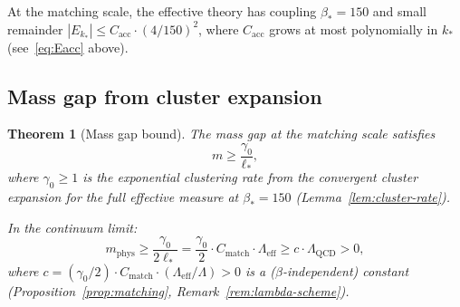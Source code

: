 \documentclass[11pt]{article}
\newtheorem{theorem}{Theorem}[section]
\theoremstyle{definition}
\newcommand{\Lam}{\Lambda_{\mathrm{QCD}}}
\begin{document}
At the matching scale, the effective theory has coupling $\beta_*=150$
and small remainder $|E_{k_*}|\le C_{\mathrm{acc}}\cdot(4/150)^2$,
where $C_{\mathrm{acc}}$ grows at most polynomially in $k_*$
(see~\eqref{eq:Eacc} above).

\subsection{Mass gap from cluster expansion}

\begin{theorem}[Mass gap bound]\label{thm:massgap}
The mass gap at the matching scale satisfies
\begin{equation}\label{eq:mgap}
m\ge\frac{\gamma_0}{\ell_*},
\end{equation}
where $\gamma_0\ge 1$ is the exponential clustering rate from the
convergent cluster expansion for the full effective measure at
$\beta_*=150$ (Lemma~\ref{lem:cluster-rate}).

In the continuum limit:
\begin{equation}\label{eq:mgap-phys}
m_{\mathrm{phys}}\ge\frac{\gamma_0}{2\ell_*}
=\frac{\gamma_0}{2}\cdot C_{\mathrm{match}}\cdot
\Lambda_{\mathrm{eff}}\ge c\cdot\Lam>0,
\end{equation}
where $c=(\gamma_0/2)\cdot C_{\mathrm{match}}\cdot
(\Lambda_{\mathrm{eff}}/\Lambda)>0$ is a ($\beta$-independent)
constant (Proposition~\ref{prop:matching},
Remark~\ref{rem:lambda-scheme}).
\end{theorem}
\end{document}
